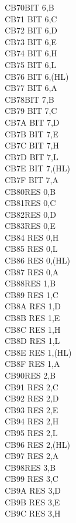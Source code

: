 \documentclass[twoside,openright,a4paper]{book}
\begin{document}
\begin{multicols}{3}
{\begin{tabbing}
	CB70\>BIT 6,B\\
	CB71\> 	BIT 6,C\\
	CB72\> 	BIT 6,D\\
	CB73\> 	BIT 6,E\\
	CB74\> 	BIT 6,H\\
	CB75\> 	BIT 6,L\\
	CB76\> 	BIT 6,(HL)\\
	CB77\> 	BIT 6,A\\
	CB78\>BIT 7,B\\
	CB79\> 	BIT 7,C\\
	CB7A\> 	BIT 7,D\\
	CB7B\> 	BIT 7,E\\
	CB7C\> 	BIT 7,H\\
	CB7D\> 	BIT 7,L\\
	CB7E\> 	BIT 7,(HL)\\
	CB7F\> 	BIT 7,A\\
	CB80\>RES 0,B\\
	CB81\>RES 0,C\\
	CB82\>RES 0,D\\
	CB83\>RES 0,E\\
	CB84\> 	RES 0,H\\
	CB85\> 	RES 0,L\\
	CB86\> 	RES 0,(HL)\\
	CB87\> 	RES 0,A\\
	CB88\>RES 1,B\\
	CB89\> 	RES 1,C\\
	CB8A\> 	RES 1,D\\
	CB8B\> 	RES 1,E\\
	CB8C\> 	RES 1,H\\
	CB8D\> 	RES 1,L\\
	CB8E\> 	RES 1,(HL)\\
	CB8F\> 	RES 1,A\\
	CB90\>RES 2,B\\
	CB91\> 	RES 2,C\\
	CB92\> 	RES 2,D\\
	CB93\> 	RES 2,E\\
	CB94\> 	RES 2,H\\
	CB95\> 	RES 2,L\\
	CB96\> 	RES 2,(HL)\\
	CB97\> 	RES 2,A\\
	CB98\>RES 3,B\\
	CB99\> 	RES 3,C\\
	CB9A\> 	RES 3,D\\
	CB9B\> 	RES 3,E\\
	CB9C\> 	RES 3,H\\

\end{tabbing}}
\end{multicols}
\end{document}
